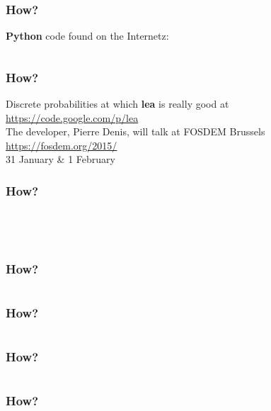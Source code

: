 \documentclass[a4paper]{beamer}
\begin{document}
\begin{frame}
\frametitle{How?} 
{\bf Python} code found on the Internetz:
\inputminted[firstline=1, lastline=15, gobble=0, linenos, mathescape, bgcolor=bg, numbersep=8pt, frame=lines, framesep=3mm, fontsize=\scriptsize]{python}{code/bullshit_generator.py}
\end{frame}

\begin{frame}
\frametitle{How?} 
Discrete probabilities
at which {\bf lea} is really good at
\url{https://code.google.com/p/lea}
\\
The developer, Pierre Denis, will talk at FOSDEM Brussels
\\
\url{https://fosdem.org/2015/}
\\
31 January \& 1 February
\end{frame}

\begin{frame}
\frametitle{How?} 
\inputminted[firstline=13, lastline=15, gobble=0, linenos, mathescape, bgcolor=bg, numbersep=8pt, frame=lines, framesep=3mm, fontsize=\scriptsize]{python}{code/bullshit_generator.py}
\\
\inputminted[firstline=71, lastline=79, gobble=0, linenos, mathescape, bgcolor=bg, numbersep=8pt, frame=lines, framesep=3mm, fontsize=\scriptsize]{python}{code/bullshit_generator.py}
\end{frame}

\begin{frame}
\frametitle{How?} 
\inputminted[firstline=100, lastline=106, gobble=0, linenos, mathescape, bgcolor=bg, numbersep=8pt, frame=lines, framesep=3mm, fontsize=\scriptsize]{python}{code/bullshit_generator.py}
\end{frame}

\begin{frame}
\frametitle{How?} 
\inputminted[firstline=123, lastline=133, gobble=0, linenos, mathescape, bgcolor=bg, numbersep=8pt, frame=lines, framesep=3mm, fontsize=\scriptsize]{python}{code/bullshit_generator.py}
\end{frame}

\begin{frame}
\frametitle{How?} 
\inputminted[firstline=164, lastline=173, gobble=0, linenos, mathescape, bgcolor=bg, numbersep=8pt, frame=lines, framesep=3mm, fontsize=\scriptsize]{python}{code/bullshit_generator.py}
\end{frame}

\begin{frame}
\frametitle{How?} 
\inputminted[firstline=175, lastline=180, gobble=0, linenos, mathescape, bgcolor=bg, numbersep=8pt, frame=lines, framesep=3mm, fontsize=\scriptsize]{python}{code/bullshit_generator.py}
\end{frame}
\end{document}
